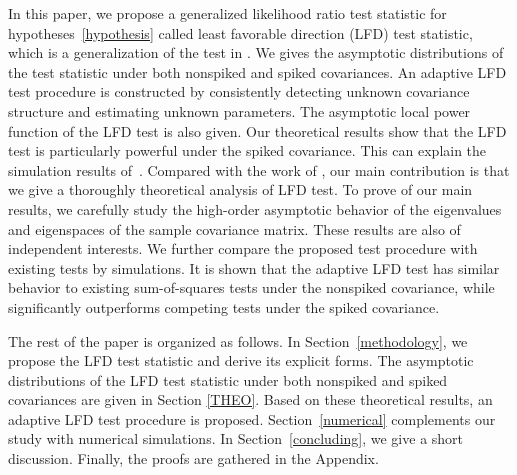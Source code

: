 \documentclass[12pt]{article} %
\theoremstyle{definition}
\begin{document}
    In this paper, we propose a generalized likelihood ratio test statistic for hypotheses~\eqref{hypothesis} called least favorable direction (LFD) test statistic, which is a generalization of the test in \cite{Zhao2016A}.
    We gives the asymptotic distributions of the test statistic under both nonspiked and spiked covariances.
    An adaptive LFD test procedure is constructed by consistently detecting unknown covariance structure and estimating unknown parameters.
    The asymptotic local power function of the LFD test is also given.
    Our theoretical results show that the LFD test is particularly powerful under the spiked covariance.
    This can explain the simulation results of~\cite{Zhao2016A}.
    Compared with the work of \cite{Zhao2016A}, our main contribution is that we give a thoroughly theoretical analysis of LFD test.
    To prove of our main results, we carefully study the high-order asymptotic behavior of the eigenvalues and eigenspaces of the sample covariance matrix.
    These results are also of independent interests.
    We further compare the proposed test procedure with existing tests by simulations.
    It is shown that the adaptive LFD test has similar behavior to existing sum-of-squares tests under the nonspiked covariance, while significantly outperforms competing tests under the spiked covariance.

    The rest of the paper is organized  as follows.
    In Section~\ref{methodology}, we propose the LFD test statistic and derive its explicit forms.
    The asymptotic distributions of the LFD test statistic under both nonspiked and spiked covariances are given in Section \ref{THEO}.
    Based on these theoretical results, an adaptive LFD test procedure is proposed.
     Section~\ref{numerical} complements our study with numerical simulations.
     In Section~\ref{concluding}, we give a short discussion.
     Finally, the proofs are gathered in the Appendix.





 
\end{document}
